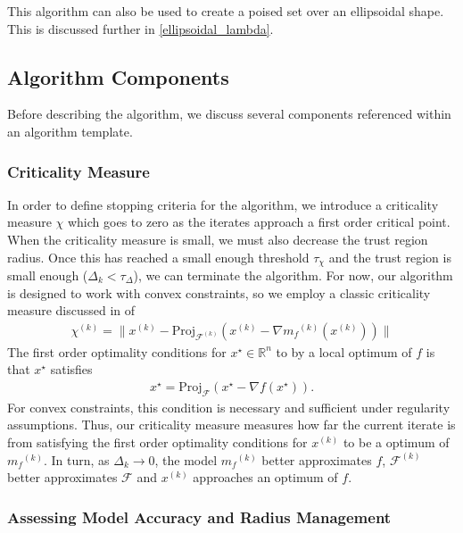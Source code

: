 \documentclass{article}
\theoremstyle{case}
\newcommand{\xk}{{x^{(k)}}}
\newcommand{\Rn}{\mathbb R^n}
\newcommand{\dk}{\Delta_k}
\newcommand{\mfk}{{{m}_f}^{(k)}}
\newcommand{\feasible}{{\mathcal F}}
\newcommand{\feasiblek}{{\mathcal F^{(k)}}}
\newcommand{\chik}{{\chi^{(k)}}}
\begin{document}
This algorithm can also be used to create a poised set over an ellipsoidal shape.
This is discussed further in \cref{ellipsoidal_lambda}.



\subsection{Algorithm Components}

Before describing the algorithm, we discuss several components referenced within an algorithm template.

\subsubsection{Criticality Measure}

In order to define stopping criteria for the algorithm, we introduce a criticality measure $\chi$ which goes to zero as the iterates approach a first order critical point.
When the criticality measure is small, we must also decrease the trust region radius.
Once this has reached a small enough threshold $\tau_{\chi}$ and the trust region is small enough ($\Delta_k < \tau_{\Delta}$), we can terminate the algorithm.
For now, our algorithm is designed to work with convex constraints, so we employ a classic criticality measure discussed in \cite{ConnGoulToin00} of
\begin{align}
\label{critical}
\chik = \|\xk - \text{Proj}_{\feasiblek}(\xk- \nabla \mfk(\xk))\|
\end{align}
The first order optimality conditions for $x^{\star} \in \Rn$ to by a local optimum of $f$ is that $x^{\star}$ satisfies
\begin{align*}
x^{\star} = \text{Proj}_{\feasible}\left(x^{\star} - \nabla f(x^{\star})\right).
\end{align*}
For convex constraints, this condition is necessary and sufficient under regularity assumptions.
Thus, our criticality measure measures how far the current iterate is from satisfying the first order optimality conditions for $\xk$ to be a optimum of $\mfk$.
In turn, as $\dk \to 0$, the model $\mfk$ better approximates $f$, $\feasiblek$ better approximates $\feasible$ and $\xk$ approaches an optimum of $f$.

\subsubsection{Assessing Model Accuracy and Radius Management}
\end{document}
